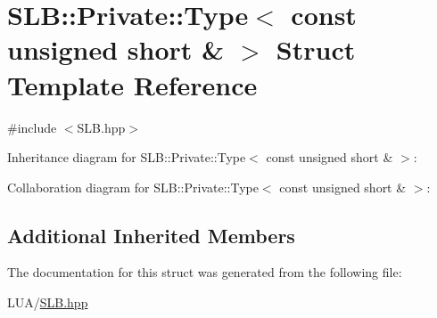 \hypertarget{structSLB_1_1Private_1_1Type_3_01const_01unsigned_01short_01_6_01_4}{}\section{S\+LB\+:\+:Private\+:\+:Type$<$ const unsigned short \& $>$ Struct Template Reference}
\label{structSLB_1_1Private_1_1Type_3_01const_01unsigned_01short_01_6_01_4}


{\ttfamily \#include $<$S\+L\+B.\+hpp$>$}



Inheritance diagram for S\+LB\+:\+:Private\+:\+:Type$<$ const unsigned short \& $>$\+:


Collaboration diagram for S\+LB\+:\+:Private\+:\+:Type$<$ const unsigned short \& $>$\+:
\subsection*{Additional Inherited Members}


The documentation for this struct was generated from the following file\+:\begin{DoxyCompactItemize}
\item 
L\+U\+A/\hyperlink{SLB_8hpp}{S\+L\+B.\+hpp}\end{DoxyCompactItemize}
